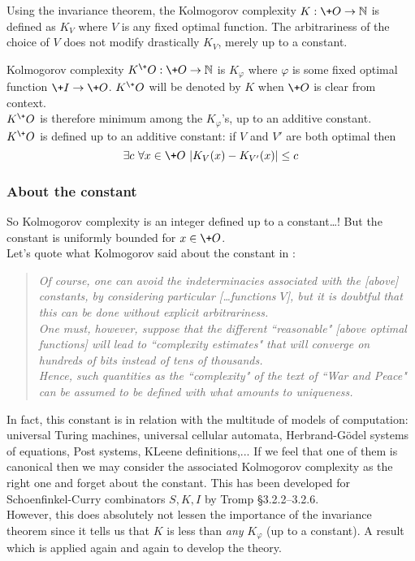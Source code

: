 Using the invariance theorem, the Kolmogorov complexity
$K:\+O\to{\mathbb N}$ is defined as $K_V$ where $V$ is any fixed optimal function.
The arbitrariness of the choice of $V$ does not modify
drastically $K_V$, merely up to a constant.
\begin{definition}
Kolmogorov complexity $K^\+O:\+O\to{\mathbb N}$ is
$K_\varphi$ where $\varphi$ is some fixed
optimal function $\+I\to\+O$.
$K^\+O$ will be denoted by $K$ when $\+O$ is clear from context.
\\
$K^\+O$ is therefore minimum among the $K_\varphi$'s,
up to an additive constant.
\medskip\\
$K^\+O$ is defined up to an additive constant:
if $V$ and $V'$ are both optimal then
$$
\exists c\ \forall x\in\+O\ |K_V(x) - K_{V'}(x)| \leq c
$$
\end{definition}
\subsubsection{About the constant}
So Kolmogorov complexity is an integer defined up to
a constant\ldots !
But the constant is uniformly bounded for $x\in\+O$.
\\
Let's quote what Kolmogorov said about the constant
in \cite{kolmo65}:
\begin{quote}\em
Of course, one can avoid the indeterminacies
associated with the [above] constants,
by considering particular [\ldots functions $V$],
but it is doubtful that this can be done without
explicit arbitrariness.
\\
One must, however, suppose that the different
``reasonable" [above optimal functions] will lead to
``complexity estimates"
that will converge on hundreds of bits
instead of tens of thousands.
\\
Hence, such quantities as the ``complexity" of the text of
``War and Peace" can be assumed to be defined
with what amounts to uniqueness.
\end{quote}
In fact, this constant is in relation with the multitude
of models of computation: universal Turing machines,
universal cellular automata,
Herbrand-G\"odel systems of equations, Post systems,
KLeene definitions,...
If we feel that one of them is canonical then we may consider
the associated Kolmogorov complexity as the right one
and forget about the constant.
This has been developed for Schoenfinkel-Curry combinators
$S,K,I$ by Tromp \cite{livitanyi} \S3.2.2--3.2.6.
\\
However, this does absolutely not lessen the importance
of the invariance theorem since it tells us that $K$ is less
than {\em any} $K_\varphi$ (up to a constant).
A result which is applied again and again to develop the theory.
